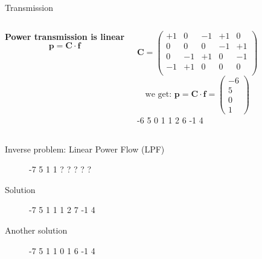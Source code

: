 \documentclass[10pt]{beamer}
\newcommand{\mat}[1]{\ensuremath{\boldsymbol{{#1}}}}
\begin{document}
\begin{frame}{Transmission}
    \begin{columns}[T,onlytextwidth]
    {
    \begin{block}{\textbf{Power transmission is linear}}
        \[\mat{p} = \mat{C}\cdot \mat{f}\]
      \end{block}
      }
    \[\mat{C}=\begin{pmatrix}
    +1& 0&-1&+1& 0\\
     0& 0& 0&-1&+1\\
     0&-1&+1& 0&-1\\
    -1&+1& 0& 0& 0\\
    \end{pmatrix}\]
    \[\text{we get: } \mat{p}=\mat{C}\cdot\mat{f}=\begin{pmatrix}
    -6\\5\\0\\1
    \end{pmatrix}\]
    \graafjeduitsland
        {-6}
        {5}
        {0}
        {1}
        {1}
        {2}
        {6}
        {-1}
        {4}
    \end{columns}
\end{frame}

\begin{frame}{Inverse problem: Linear Power Flow (LPF)}
    \begin{figure}
        \centering
        \graafjeduitsland
        {-7}
        {5}
        {1}
        {1}
        {?}
        {?}
        {?}
        {?}
        {?}
    \end{figure}
\end{frame}

\begin{frame}{Solution}
    \begin{figure}
        \centering
        \graafjeduitsland
        {-7}
        {5}
        {1}
        {1}
        {1}
        {2}
        {7}
        {-1}
        {4}
    \end{figure}
\end{frame}

\begin{frame}{Another solution}
    \begin{figure}
        \centering
        \graafjeduitsland
        {-7}
        {5}
        {1}
        {1}
        {0}
        {1}
        {6}
        {-1}
        {4}
    \end{figure}
\end{frame}
\end{document}
